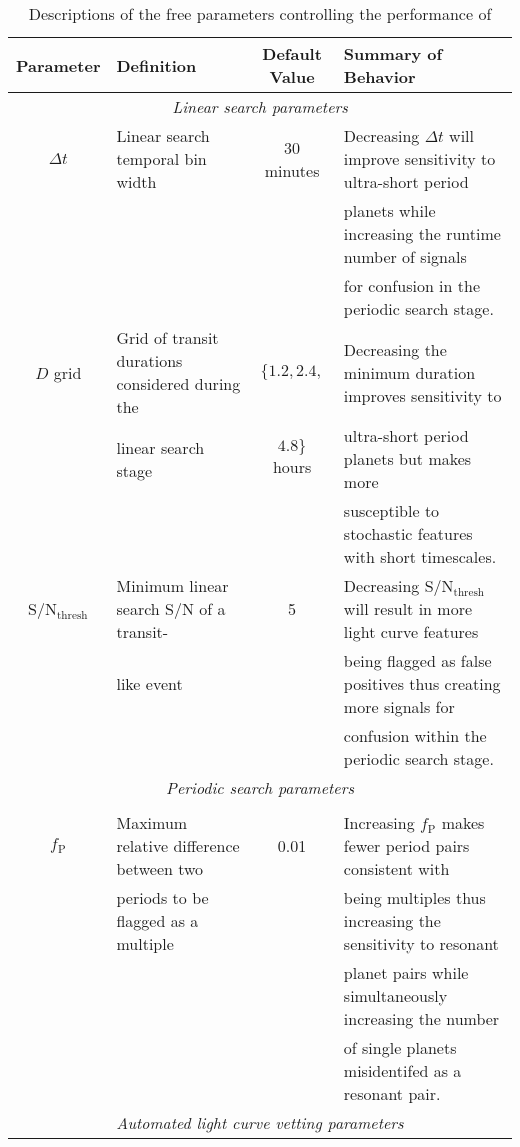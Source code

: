 \clearpage
\begin{landscape}
 \begin{longtable}[c]{clcl}
  \caption{Descriptions of the free parameters controlling the performance of \pipeline{}\label{oriontable:freeparams}} \\
    \hline
    Parameter & Definition & Default Value & Summary of Behavior \\
    \hline
    \multicolumn{4}{c}{\emph{Linear search parameters}} \\
    \hline
    $\Delta t$ & Linear search temporal bin width & 30 minutes &
    Decreasing $\Delta t$ will improve sensitivity to ultra-short period \\
    &&& planets while increasing the \pipeline{} runtime number of signals \\
    &&& for confusion in the periodic search stage. \\ 
    $D$ grid & Grid of transit durations considered during the & $\{1.2,2.4,$ &
    Decreasing the minimum duration improves sensitivity to \\
    & linear search stage & $4.8\}$ hours &
    ultra-short period planets but makes \pipeline{} more \\
    &&& susceptible to stochastic features with short timescales. \\ 
    S/N$_{\text{thresh}}$ & Minimum linear search S/N of a transit- & 5 &
    Decreasing S/N$_{\text{thresh}}$ will result in more light curve features \\
    & like event &&
    being flagged as false positives thus creating more signals for \\
    &&& confusion within the periodic search stage.  \\
    \multicolumn{4}{c}{\emph{Periodic search parameters}} \\
    \hline \\
    $f_{\text{P}}$ & Maximum relative difference between two  & 0.01 &
    Increasing $f_{\text{P}}$ makes fewer period pairs consistent with  \\
    & periods to be flagged as a multiple &&
    being multiples thus increasing the sensitivity to resonant \\
    &&& planet pairs while simultaneously increasing the number \\
    &&& of single planets misidentifed as a resonant pair.  \\
    \multicolumn{4}{c}{\emph{Automated light curve vetting parameters}} \\

\end{longtable}
\end{landscape}
